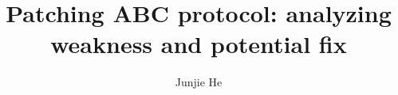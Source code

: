 \documentclass[sigchi,12]{acmart}  %
\begin{document}
\title{Patching ABC protocol: analyzing weakness and potential fix}
\author{Junjie He}
\begin{abstract}
\end{abstract}
\maketitle



\end{document}
